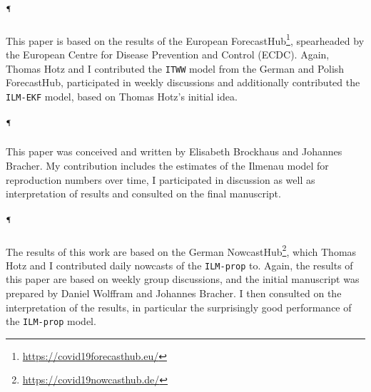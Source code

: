 \begin{refsection}
\paragraph{\cite{Sherratt2022Predictive}$^\mathparagraph$}
This paper is based on the results of the  European ForecastHub\footnote{\url{https://covid19forecasthub.eu/}}, spearheaded by the European Centre for Disease Prevention and Control (ECDC). Again, Thomas Hotz and I contributed the \texttt{ITWW} model from the German and Polish ForecastHub, participated in weekly discussions and additionally contributed the \texttt{ILM-EKF} model, based on Thomas Hotz's initial idea. 



\paragraph{\cite{Brockhaus2023Why}$^\mathparagraph$}
This paper was conceived and written by Elisabeth Brockhaus and Johannes Bracher. My contribution includes the estimates of the Ilmenau model for reproduction numbers over time, I participated in discussion as well as interpretation of results and consulted on the final manuscript. 

\paragraph{\cite{Wolffram2023Collaborative}$^\mathparagraph$}
The results of this work are based on the German NowcastHub\footnote{\url{https://covid19nowcasthub.de/}}, which Thomas Hotz and I contributed daily nowcasts of the \texttt{ILM-prop} to. Again, the results of this paper are based on weekly group discussions, and the initial manuscript was prepared by Daniel Wolffram and Johannes Bracher. I then consulted on the interpretation of the results, in particular the surprisingly good performance of the \texttt{ILM-prop} model.\\[18pt]

\printbibliography[heading=custom, title={Own publications}]
\end{refsection}
